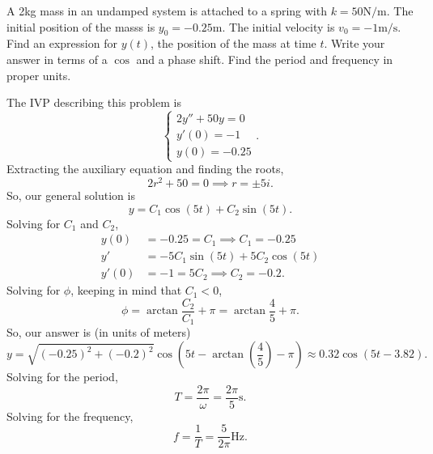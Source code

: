 \begin{example}
	A 2kg mass in an undamped system is attached to a spring with $k = 50 \text{N/m}$. The initial position of the masss is $y_0 = -0.25\text{m}$. The initial velocity is $v_0 = -1\text{m/s}$. Find an expression for $y(t)$, the position of the mass at time $t$. Write your answer in terms of a $\cos$ and a phase shift. Find the period and frequency in proper units.
\end{example}
\noindent
The IVP describing this problem is
\begin{equation*}
	\begin{cases}
		2y'' + 50y = 0 \\
		y'(0) = -1 \\
		y(0) = -0.25
	\end{cases}.
\end{equation*}
Extracting the auxiliary equation and finding the roots,
\begin{equation*}
	2r^2 + 50 = 0 \implies r = \pm 5i.
\end{equation*}
So, our general solution is
\begin{equation*}
	y = C_1\cos{(5t)} + C_2\sin{(5t)}.
\end{equation*}
Solving for $C_1$ and $C_2$,
\begin{align*}
	y(0) &= -0.25 = C_1 \implies C_1 = -0.25 \\
	y' &= -5C_1\sin{(5t)} + 5C_2\cos{(5t)} \\
	y'(0) &= -1 = 5C_2 \implies C_2 = -0.2.
\end{align*}
Solving for $\phi$, keeping in mind that $C_1 < 0$,
\begin{equation*}
	\phi = \arctan{\frac{C_2}{C_1}} + \pi = \arctan{\frac{4}{5}} + \pi.
\end{equation*}
So, our answer is (in units of meters)
\begin{equation*}
	y = \sqrt{(-0.25)^2 + (-0.2)^2}\cos{\left(5t - \arctan{\left(\frac{4}{5}\right)} - \pi\right)} \approx 0.32\cos{\left(5t - 3.82\right)}.
\end{equation*}
Solving for the period,
\begin{equation*}
	T = \frac{2\pi}{\omega} = \frac{2\pi}{5} \text{s}.
\end{equation*}
Solving for the frequency,
\begin{equation*}
	f = \frac{1}{T} = \frac{5}{2\pi} \text{Hz}.
\end{equation*}
